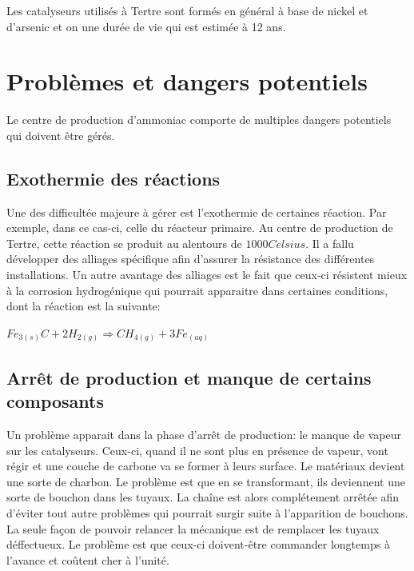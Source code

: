 Les catalyseurs utilisés à Tertre sont formés en général à base de nickel et d'arsenic et on une durée de vie qui est estimée à 12 ans.

\section*{Problèmes et dangers potentiels}
Le centre de production d'ammoniac comporte de multiples dangers potentiels qui doivent être gérés. 

\subsection*{Exothermie des réactions}
Une des difficultée majeure à gérer est l'exothermie de certaines réaction. Par exemple, dans ce cas-ci, celle du réacteur primaire. Au centre de production de Tertre, cette réaction se produit au alentours de $\unit{1000}{Celsius}$. Il a fallu développer des alliages spécifique afin d'assurer la résistance des différentes installations. Un autre avantage des alliages est le fait que ceux-ci résistent mieux à la corrosion hydrogénique qui pourrait apparaitre dans certaines conditions, dont la réaction est la suivante:

$Fe_{3(s)}C+2H_{2(g)} \Rightarrow CH_{4(g)} + 3Fe_{(aq)}$

\subsection*{Arrêt de production et manque de certains composants}
Un problème apparait dans la phase d'arrêt de production: le manque de vapeur sur les catalyseurs. Ceux-ci, quand il ne sont plus en présence de vapeur, vont régir et une couche de carbone va se former à leurs surface. Le matériaux devient une sorte de charbon. Le problème est que en se transformant, ils deviennent une sorte de bouchon dans les tuyaux. La chaîne est alors complétement arrêtée afin d'éviter tout autre problèmes qui pourrait surgir suite à l'apparition de bouchons. La seule façon de pouvoir relancer la mécanique est de remplacer les tuyaux déffectueux. Le problème est que ceux-ci doivent-être commander longtemps à l'avance et coûtent cher à l'unité.

